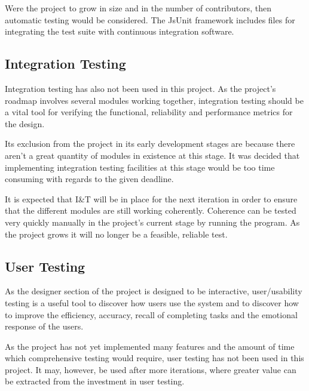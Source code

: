 Were the project to grow in size and in the number of contributors, then automatic testing would be considered. The JsUnit framework includes files for integrating the test suite with continuous integration software.

\subsection{Integration Testing}
Integration testing has also not been used in this project. As the project's roadmap involves several modules working together, integration testing should be a vital tool for verifying the functional, reliability and performance metrics for the design.

Its exclusion from the project in its early development stages are because there aren't a great quantity of modules in existence at this stage. It was decided that implementing integration testing facilities at this stage would be too time consuming with regards to the given deadline.

It is expected that I\&T will be in place for the next iteration in order to ensure that the different modules are still working coherently. Coherence can be tested very quickly manually in the project's current stage by running the program. As the project grows it will no longer be a feasible, reliable test.

\subsection{User Testing}
As the designer section of the project is designed to be interactive, user\slash usability testing is a useful tool to discover how users use the system and to discover how to improve the efficiency, accuracy, recall of completing tasks and the emotional response of the users.

As the project has not yet implemented many features and the amount of time which comprehensive testing would require, user testing has not been used in this project. It may, however, be used after more iterations, where greater value can be extracted from the investment in user testing.




